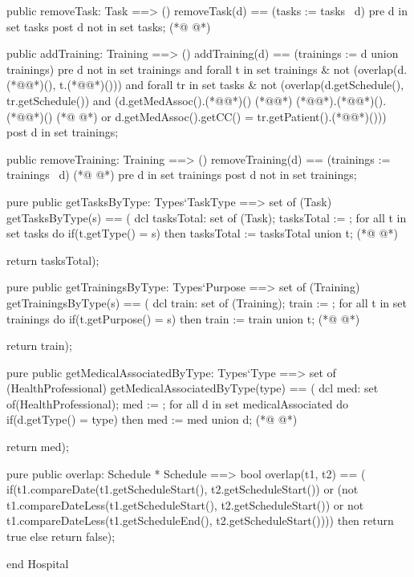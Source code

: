\begin{vdmpp}[breaklines=true]
 public removeTask: Task ==> ()
  removeTask(d) == (tasks := tasks \ {d})
 pre d in set tasks
 post d not in set tasks;
(*@
\label{addTraining:59}
@*)
 
 public addTraining: Training ==> ()
  addTraining(d) == (trainings := {d} union trainings)
 pre d not in set trainings and forall t in set trainings & not (overlap(d.(*@@*)(), t.(*@@*)()))
 and forall tr in set tasks & not (overlap(d.getSchedule(), tr.getSchedule()) and (d.getMedAssoc().(*@@*)() (*@\vdmnotcovered{=}@*) (*@@*).(*@@*)().(*@@*)() 
(*@
\label{removeTraining:64}
@*)
 or d.getMedAssoc().getCC() = tr.getPatient().(*@@*)()))
 post d in set trainings;
  
 public removeTraining: Training ==> ()
  removeTraining(d) == (trainings := trainings \ {d})
(*@
\label{getTasksByType:69}
@*)
 pre d in set trainings
 post d not in set trainings;
 
 pure public getTasksByType: Types`TaskType ==> set of (Task)
  getTasksByType(s) == (
              dcl tasksTotal: set of (Task);
              tasksTotal := {};
              for all t in set tasks do
               if(t.getType() = s)
                then tasksTotal := tasksTotal union {t};
(*@
\label{getTrainingsByType:79}
@*)
                
              return tasksTotal);
              
 pure public getTrainingsByType: Types`Purpose ==> set of (Training)
  getTrainingsByType(s) == (
              dcl train: set of (Training);
              train := {};
              for all t in set trainings do
               if(t.getPurpose() = s)
                then train := train union {t};
(*@
\label{getMedicalAssociatedByType:89}
@*)
                
              return train);

 pure public getMedicalAssociatedByType: Types`Type ==> set of (HealthProfessional)
  getMedicalAssociatedByType(type) == (
           dcl med: set of(HealthProfessional);
           med := {};
           for all d in set medicalAssociated do
            if(d.getType() = type)
             then med := med union {d};
(*@
\label{overlap:99}
@*)
            
           return med);
           
 pure public overlap: Schedule * Schedule ==> bool
  overlap(t1, t2) == (
             if(t1.compareDate(t1.getScheduleStart(), t2.getScheduleStart()) 
              or (not t1.compareDateLess(t1.getScheduleStart(), t2.getScheduleStart()) 
              or not t1.compareDateLess(t1.getScheduleEnd(), t2.getScheduleStart())))
              then return true
             else
              return false);
              
end Hospital
\end{vdmpp}
